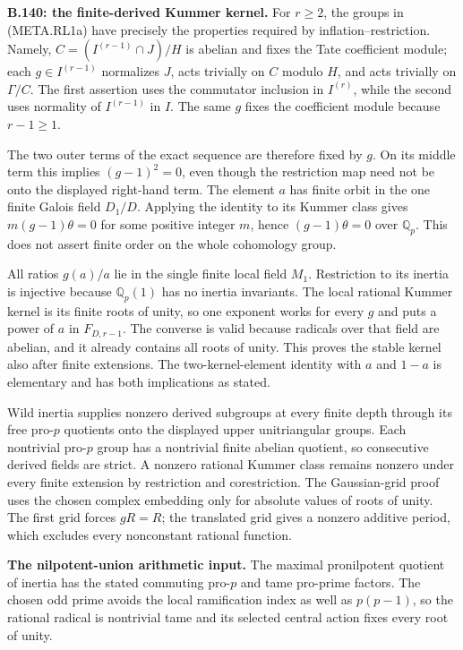 \medskip\noindent\textbf{B.140: the finite-derived Kummer kernel.}
For $r\ge2$, the groups in (META.RL1a) have precisely the
properties required by inflation--restriction.  Namely,
$C=(I^{(r-1)}\cap J)/H$ is abelian and fixes the Tate
coefficient module; each $g\in I^{(r-1)}$ normalizes
$J$, acts trivially on $C$ modulo $H$, and acts trivially
on $\Gamma/C$.  The first assertion uses the commutator
inclusion in $I^{(r)}$, while the second uses normality
of $I^{(r-1)}$ in $I$.  The same $g$ fixes the coefficient
module because $r-1\ge1$.

The two outer terms of the exact sequence are therefore
fixed by $g$.  On its middle term this implies
$(g-1)^2=0$, even though the restriction map need not
be onto the displayed right-hand term.  The element
$a$ has finite orbit in the one finite Galois field
$D_1/D$.  Applying the identity to its Kummer class
gives $m(g-1)\theta=0$ for some positive integer $m$,
hence $(g-1)\theta=0$ over $\mathbb Q_p$.
This does not assert finite order on the whole
cohomology group.

All ratios $g(a)/a$ lie in the single finite local
field $M_1$.  Restriction to its inertia is injective
because $\mathbb Q_p(1)$ has no inertia invariants.
The local rational Kummer kernel is its finite roots
of unity, so one exponent works for every $g$ and
puts a power of $a$ in $F_{D,r-1}$.  The converse is
valid because radicals over that field are abelian,
and it already contains all roots of unity.  This
proves the stable kernel also after finite extensions.
The two-kernel-element identity with $a$ and $1-a$
is elementary and has both implications as stated.

Wild inertia supplies nonzero derived subgroups at
every finite depth through its free pro-$p$ quotients
onto the displayed upper unitriangular groups.
Each nontrivial pro-$p$ group has a nontrivial finite
abelian quotient, so consecutive derived fields are
strict.  A nonzero rational Kummer class remains
nonzero under every finite extension by restriction
and corestriction.  The Gaussian-grid proof uses
the chosen complex embedding only for absolute values
of roots of unity.  The first grid forces $gR=R$;
the translated grid gives a nonzero additive period,
which excludes every nonconstant rational function.

\medskip\noindent\textbf{The nilpotent-union arithmetic input.}
The maximal pronilpotent quotient of inertia has the
stated commuting pro-$p$ and tame pro-prime factors.
The chosen odd prime avoids the local ramification
index as well as $p(p-1)$, so the rational radical
is nontrivial tame and its selected central action
fixes every root of unity.


